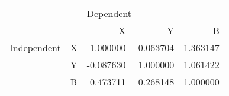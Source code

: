 \begin{tabular}{llrrr}
\toprule
            &   & \multicolumn{3}{l}{Dependent} \\
            &   &         X &         Y &         B \\
\midrule
Independent & X &  1.000000 & -0.063704 &  1.363147 \\
            & Y & -0.087630 &  1.000000 &  1.061422 \\
            & B &  0.473711 &  0.268148 &  1.000000 \\
\bottomrule
\end{tabular}
